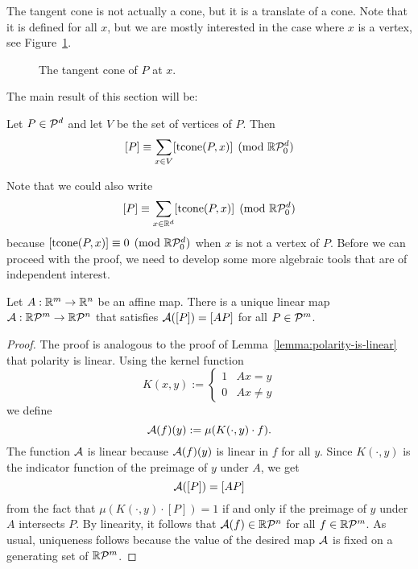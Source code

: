 The tangent cone is not actually a cone, but it is a translate of a cone.
Note that it is defined for all $x$,
but we are mostly interested in the case where $x$ is a vertex, see Figure~\ref{fig:tangent-cone}.
\begin{figure}
  \begin{center}
  \end{center}
  \caption{The tangent cone of $P$ at $x$.}
  \label{fig:tangent-cone}
\end{figure}
The main result of this section will be:

\begin{theorem}[Brion]
  \label{thm:brion}
  Let $P \in \mathcal{P}^d$ and let $V$ be the set of vertices of $P$.
  Then
  \[
    [P] \equiv \sum_{x \in V} [\operatorname{tcone}(P,x)] \pmod{\mathbb{R}\mathcal{P}_0^d}
  \]
\end{theorem}

Note that we could also write
\[
  [P] \equiv \sum_{x \in \mathbb{R}^d} [\operatorname{tcone}(P,x)] \pmod{\mathbb{R}\mathcal{P}_0^d}
\]
because $[\operatorname{tcone}(P,x)] \equiv 0 \pmod{\mathbb{R}\mathcal{P}_0^d}$ when $x$ is not a vertex of $P$.
Before we can proceed with the proof,
we need to develop some more algebraic tools that are of independent interest.

\begin{lemma}
  \label{lemma:polyhedra-affine}
  Let $A : \mathbb{R}^m \to \mathbb{R}^n$ be an affine map.
  There is a unique linear map $\mathcal{A}: \mathbb{R}\mathcal{P}^m \to \mathbb{R}\mathcal{P}^n$
  that satisfies $\mathcal{A}([P]) = [AP]$ for all $P \in \mathcal{P}^m$.
\end{lemma}
\begin{proof}
  The proof is analogous to the proof of Lemma~\ref{lemma:polarity-is-linear} that polarity is linear.
  Using the kernel function
  \[
    K(x,y) := \begin{cases} 1 & Ax = y \\ 0 & Ax \neq y \end{cases}
  \]
  we define
  \[
    \mathcal{A}(f)(y) := \mu(K(\cdot, y) \cdot f).
  \]
  The function $\mathcal{A}$ is linear because $\mathcal{A}(f)(y)$ is linear in $f$ for all $y$.
  Since $K(\cdot,y)$ is the indicator function of the preimage of $y$ under $A$,
  we get
  \[
    \mathcal{A}([P]) = [AP]
  \]
  from the fact that $\mu(K(\cdot, y) \cdot [P]) = 1$ if and only if the preimage of $y$ under $A$ intersects $P$.
  By linearity, it follows that $\mathcal{A}(f) \in \mathbb{R}\mathcal{P}^n$ for all $f \in \mathbb{R}\mathcal{P}^m$.
  As usual, uniqueness follows because the value of the desired map $\mathcal{A}$ is fixed on a generating set of $\mathbb{R}\mathcal{P}^m$.
\end{proof}


